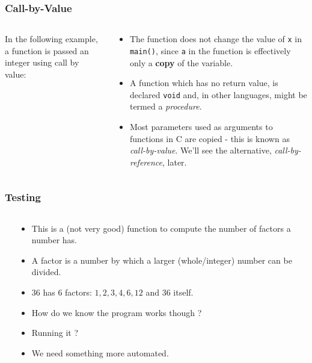 \begin{frame}[fragile]
\frametitle{Call-by-Value}

\begin{columns}

\begin{column}{0.45\textwidth}
In the following example, a function is passed an integer
using call by value:

\end{column}

\begin{column}{0.45\textwidth}
\begin{itemize}[<+->]
\item The function does not change the value of \verb^x^ in
\verb^main()^, since {\tt a} in the function is effectively
only a {\bf copy} of the variable.
\item A function which has no return value, is declared \verb^void^
and, in other languages, might be termed a {\it procedure}.
\item Most parameters used as arguments to functions in C are copied - this is known as {\it call-by-value}. We'll see the alternative, {\it call-by-reference}, later.
\end{itemize}
\end{column}

\end{columns}
\end{frame}



\begin{frame}[fragile]
\frametitle{Testing}
\begin{columns}

\begin{column}{0.40\textwidth}

\end{column}

\begin{column}{0.50\textwidth}
\begin{itemize}[<+->]
\item This is a (not very good) function to compute the number of factors a number has.
\item A factor is a number by which a larger (whole/integer) number can be divided.
\item $36$ has $6$ factors: $1, 2, 3, 4, 6, 12$ and $36$ itself.
\item How do we know the program works though ?
\item Running it ? 
\item We need something more automated.
\end{itemize}
\end{column}

\end{columns}
\end{frame}

